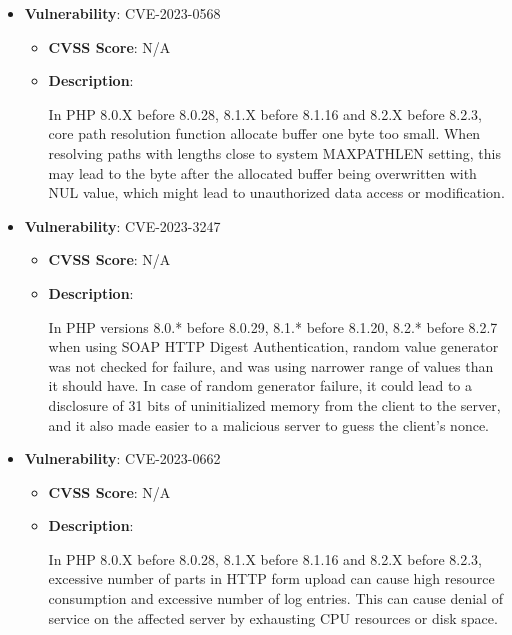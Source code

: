 \documentclass{article}
\begin{document}
\begin{itemize}
        \item \textbf{Vulnerability}: CVE-2023-0568
        \begin{itemize}
            \item \textbf{CVSS Score}:  N/A 
            \item \textbf{Description}:
            \parbox[t]{0.9\linewidth}{
                \ttfamily In PHP 8.0.X before 8.0.28, 8.1.X before 8.1.16 and 8.2.X before 8.2.3, core path resolution function allocate buffer one byte too small. When resolving paths with lengths close to system MAXPATHLEN setting, this may lead to the byte after the allocated buffer being overwritten with NUL value, which might lead to unauthorized data access or modification.
            }
        \end{itemize}
    
        \item \textbf{Vulnerability}: CVE-2023-3247
        \begin{itemize}
            \item \textbf{CVSS Score}:  N/A 
            \item \textbf{Description}:
            \parbox[t]{0.9\linewidth}{
                \ttfamily In PHP versions 8.0.* before 8.0.29, 8.1.* before 8.1.20, 8.2.* before 8.2.7 when using SOAP HTTP Digest Authentication, random value generator was not checked for failure, and was using narrower range of values than it should have. In case of random generator failure, it could lead to a disclosure of 31 bits of uninitialized memory from the client to the server, and it also made easier to a malicious server to guess the client's nonce.
            }
        \end{itemize}
    
        \item \textbf{Vulnerability}: CVE-2023-0662
        \begin{itemize}
            \item \textbf{CVSS Score}:  N/A 
            \item \textbf{Description}:
            \parbox[t]{0.9\linewidth}{
                \ttfamily In PHP 8.0.X before 8.0.28, 8.1.X before 8.1.16 and 8.2.X before 8.2.3, excessive number of parts in HTTP form upload can cause high resource consumption and excessive number of log entries. This can cause denial of service on the affected server by exhausting CPU resources or disk space.
            }
        \end{itemize}
    

\end{itemize}
\end{document}
